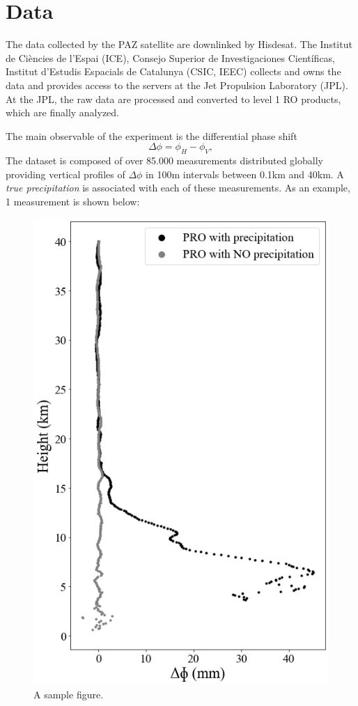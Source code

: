 \documentclass[twocolumn]{revtex4}
\begin{document}
\section{Data}

The data collected by the PAZ satellite are downlinked by Hisdesat.
The Institut de Ciències de l'Espai (ICE), Consejo Superior de Investigaciones
Científicas, Institut d'Estudis Espacials de Catalunya (CSIC, IEEC) collects 
and owns the data and provides access to the servers at the Jet Propulsion 
Laboratory (JPL). At the JPL, the raw data are processed and converted to 
level 1 RO products, which are finally analyzed.

The main observable of the experiment is the differential phase shift
\begin{equation}
    \Delta \phi =\phi_H - \phi_V,
\label{eq:1}
\end{equation}
The dataset is composed of over 85.000 measurements distributed globally 
providing vertical profiles of $\Delta\phi$  in 100m intervals between
0.1km and 40km. A {\it true precipitation} is associated with each of 
these measurements. As an example, 1 measurement is shown below: 
\begin{figure}[h!]
\centering
\includegraphics[scale=0.3]{vprofile.png}
\caption{A sample figure.}
\label{fig:sample}
\end{figure}
\end{document}
